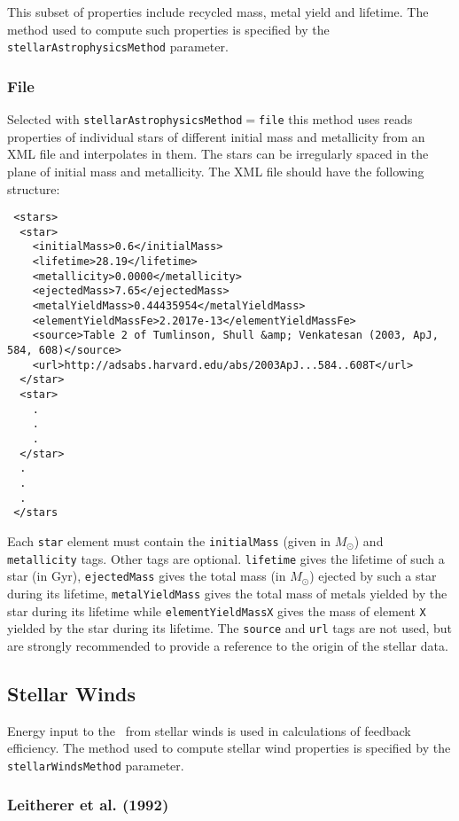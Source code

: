 This subset of properties include recycled mass, metal yield and lifetime.  The method used to compute such properties is specified by the {\tt stellarAstrophysicsMethod} parameter.

\subsubsection{File}\label{sec:StellarAstrophysicsFile}

Selected with {\tt stellarAstrophysicsMethod}$=${\tt file} this method uses reads properties of individual stars of different initial mass and metallicity from an XML file and interpolates in them. The stars can be irregularly spaced in the plane of initial mass and metallicity. The XML file should have the following structure:
\begin{verbatim}
 <stars>
  <star>
    <initialMass>0.6</initialMass>
    <lifetime>28.19</lifetime>
    <metallicity>0.0000</metallicity>
    <ejectedMass>7.65</ejectedMass>
    <metalYieldMass>0.44435954</metalYieldMass>
    <elementYieldMassFe>2.2017e-13</elementYieldMassFe>
    <source>Table 2 of Tumlinson, Shull &amp; Venkatesan (2003, ApJ, 584, 608)</source>
    <url>http://adsabs.harvard.edu/abs/2003ApJ...584..608T</url>
  </star>
  <star>
    .
    .
    .
  </star>
  .
  .
  .
 </stars
\end{verbatim}
Each {\tt star} element must contain the {\tt initialMass} (given in $M_\odot$) and {\tt metallicity} tags. Other tags are optional. {\tt lifetime} gives the lifetime of such a star (in Gyr), {\tt ejectedMass} gives the total mass (in $M_\odot$) ejected by such a star during its lifetime, {\tt metalYieldMass} gives the total mass of metals yielded by the star during its lifetime while {\tt elementYieldMassX} gives the mass of element {\tt X} yielded by the star during its lifetime. The {\tt source} and {\tt url} tags are not used, but are strongly recommended to provide a reference to the origin of the stellar data.

\subsection{Stellar Winds}

Energy input to the \ISM\ from stellar winds is used in calculations of feedback efficiency. The method used to compute stellar wind properties is specified by the {\tt stellarWindsMethod} parameter.

\subsubsection{Leitherer et al. (1992)}

